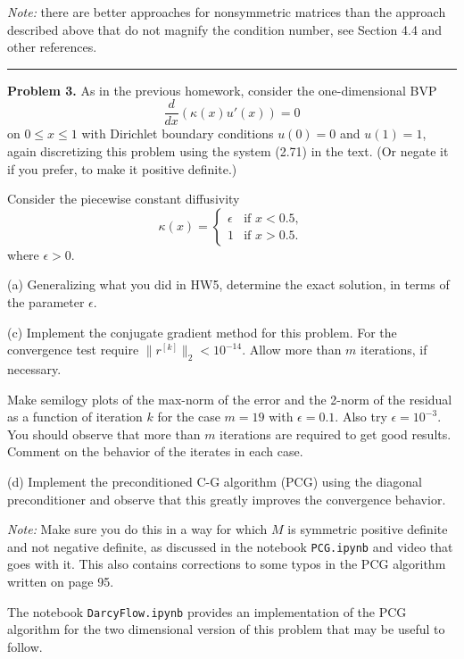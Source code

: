 \documentclass[10pt]{article}
\begin{document}
\vskip 5pt
{\em Note:} there are better approaches for nonsymmetric matrices than the 
approach described above that do not magnify the condition number, 
see Section 4.4 and other references.





\vskip 1cm
\hrule
{\bf Problem 3.}
As in the previous homework, consider the one-dimensional BVP 
\[
\frac{d}{dx}\left(\kappa(x) u'(x)\right) = 0
\]
on $0 \leq x  \leq 1$ with Dirichlet boundary conditions $u(0)=0$ and $u(1)=1$, 
again discretizing this problem using the system (2.71) in the text.  (Or
negate it if you prefer, to make it positive definite.)

Consider the piecewise constant diffusivity
\[
\kappa(x) = \begin{cases}
\epsilon & \text{if~} x < 0.5,\\
1 & \text{if~} x > 0.5.
\end{cases}
\]
where $\epsilon > 0$.

(a)  Generalizing what you did in HW5, determine the exact solution, 
in terms of the parameter $\epsilon$.

(c) Implement the conjugate gradient method for this problem. 
For the convergence test require  $\|r^{[k]}\|_2 < 10^{-14}$.
Allow more than $m$ iterations, if necessary.

Make semilogy plots of the max-norm
of the error and the 2-norm of the residual as a function of iteration $k$
for the case $m=19$ with $\epsilon = 0.1$.  Also try $\epsilon = 10^{-3}$.
You should observe that more than $m$ iterations are required to get good
results.  Comment on the behavior of the iterates in each case.

(d) Implement the preconditioned C-G algorithm (PCG) using the 
diagonal preconditioner and observe that this greatly 
improves the convergence behavior.  

{\em Note:} Make sure you do this in a way for which $M$ is symmetric
positive definite and not negative definite, as discussed in the notebook
{\tt PCG.ipynb} and video that goes with it.  This also contains corrections to 
some typos in the PCG algorithm written on page 95.

The notebook {\tt DarcyFlow.ipynb} provides an implementation of the 
PCG algorithm for the two dimensional version of this problem that 
may be useful to follow.
\end{document}
